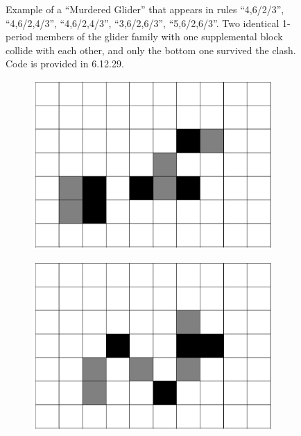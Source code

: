 \documentclass[12pt]{article}
\numberwithin{figure}{section} %
\begin{document}
\begin{figure}[H]
\begin{subfigure}{0.23\textwidth}
     	\subcaption{}
   	\end{subfigure}
   \caption{Example of a “Murdered Glider” that appears in rules “4,6/2/3”, “4,6/2,4/3”, “4,6/2,4/3”, “3,6/2,6/3”, “5,6/2,6/3”. Two identical 1-period members of the glider family with one supplemental block collide with each other, and only the bottom one survived the clash. Code is provided in 6.12.29. }
   \label{fig:murder glider one}
\end{figure}

\begin{figure}[htbp]
	\begin{subfigure}{0.23\textwidth}
     	\centering
     	\includegraphics[width=\linewidth]{Section4/33.0}
     	\subcaption{}
   	\end{subfigure}
    	\begin{subfigure}{0.23\textwidth}
     	\centering
     	\includegraphics[width=\linewidth]{Section4/33.1}

\end{subfigure}
\end{figure}
\end{document}
